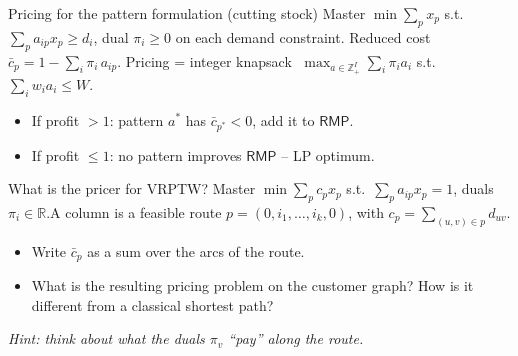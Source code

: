 \documentclass[10pt,aspectratio=169]{beamer}
\newcommand{\R}{\mathbb{R}}
\newcommand{\Z}{\mathbb{Z}}
\newcommand{\rmp}{\mathsf{RMP}}
\newcommand{\redcost}{\bar{c}}
\begin{document}
\begin{frame}{Pricing for the pattern formulation (cutting stock)}
  Master $\min\sum_p x_p$ s.t.\ $\sum_p a_{ip}x_p\ge d_i$, dual
  $\pi_i\!\ge\!0$ on each demand constraint. Reduced cost
  $\redcost_p = 1 - \sum_i \pi_i\, a_{ip}.$
  Pricing = \alert{integer knapsack}
  $\;\max_{a\in\Z_+^I}\sum_i \pi_i a_i$ s.t.\ $\sum_i w_i a_i\le W$.
  \begin{center}
  \end{center}
  \begin{itemize}\small
    \item If profit $> 1$: pattern $a^*$ has $\redcost_{p^*}<0$, add it to $\rmp$.
    \item If profit $\le 1$: \alert{no} pattern improves $\rmp$ -- LP optimum.
  \end{itemize}
\end{frame}

\begin{frame}{What is the pricer for VRPTW?}
  Master $\min\sum_p c_p x_p$ s.t.\ $\sum_p a_{ip}x_p=1$, duals
  $\pi_i\!\in\!\R$.\;A column is a feasible route
  $p=(0,i_1,\dots,i_k,0)$, with $c_p=\sum_{(u,v)\in p}d_{uv}$.

  \medskip
  \begin{keybox}[Questions]
    \begin{itemize}
      \item Write $\redcost_p$ as a sum over the arcs of the route.
      \item What is the resulting pricing problem on the customer
            graph? How is it different from a classical shortest path?
    \end{itemize}
  \end{keybox}
  \medskip
  \emph{Hint: think about what the duals $\pi_v$ ``pay'' along the route.}
\end{frame}
\end{document}
